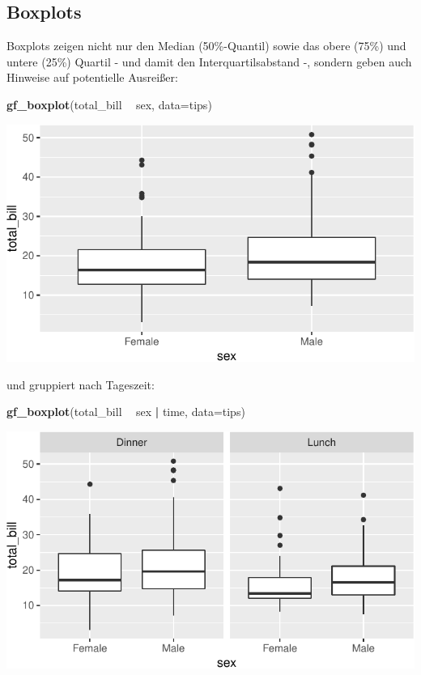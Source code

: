 \documentclass[12pt,ngerman,paper=a4,pagesize,DIV=13]{scrreprt}
\newenvironment{Shaded}{\begin{snugshade}}{\end{snugshade}}
\newcommand{\DataTypeTok}[1]{\textcolor[rgb]{0.13,0.29,0.53}{#1}}
\newcommand{\KeywordTok}[1]{\textcolor[rgb]{0.13,0.29,0.53}{\textbf{#1}}}
\newcommand{\NormalTok}[1]{#1}
\newcommand{\OperatorTok}[1]{\textcolor[rgb]{0.81,0.36,0.00}{\textbf{#1}}}
\newcommand{\StringTok}[1]{\textcolor[rgb]{0.31,0.60,0.02}{#1}}
\begin{document}
\hypertarget{boxplots}{%
\subsection{Boxplots}\label{boxplots}}

Boxplots zeigen nicht nur den Median (50\%-Quantil) sowie das obere
(75\%) und untere (25\%) Quartil - und damit den Interquartilsabstand -,
sondern geben auch Hinweise auf potentielle Ausreißer:

\begin{Shaded}
\begin{Highlighting}[]
\KeywordTok{gf_boxplot}\NormalTok{(total_bill }\OperatorTok{~}\StringTok{ }\NormalTok{sex, }\DataTypeTok{data=}\NormalTok{tips)}
\end{Highlighting}
\end{Shaded}

\includegraphics{DatenerhebungStatistik-Uebung_files/figure-latex/unnamed-chunk-46-1.pdf}

und gruppiert nach Tageszeit:

\begin{Shaded}
\begin{Highlighting}[]
\KeywordTok{gf_boxplot}\NormalTok{(total_bill }\OperatorTok{~}\StringTok{ }\NormalTok{sex }\OperatorTok{|}\StringTok{ }\NormalTok{time, }\DataTypeTok{data=}\NormalTok{tips)}
\end{Highlighting}
\end{Shaded}

\includegraphics{DatenerhebungStatistik-Uebung_files/figure-latex/unnamed-chunk-47-1.pdf}
\end{document}
